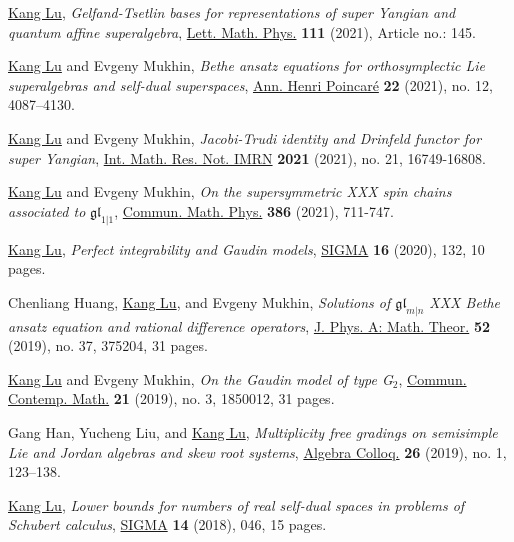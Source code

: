 \documentclass[11pt,letterpaper,roman,colorlinks,urlcolor=blue,linkcolor=blue
]{moderncv}
\begin{document}
\begin{etaremune}[leftmargin=1.17cm]
\item \underline{Kang Lu}, {\textit{Gelfand-Tsetlin bases for representations of super Yangian and quantum affine superalgebra}}, \href{https://link.springer.com/article/10.1007/s11005-021-01488-w}{Lett. Math. Phys.} \textbf{111} (2021), Article no.: 145.

\item \underline{Kang Lu} and Evgeny Mukhin, {\textit{Bethe ansatz equations for orthosymplectic Lie superalgebras and self-dual superspaces}}, \href{https://doi.org/10.1007/s00023-021-01091-8}{Ann. Henri Poincar\'{e}} \textbf{22} (2021), no. 12, 4087--4130.

\item \underline{Kang Lu} and Evgeny Mukhin, {\textit{Jacobi-Trudi identity and Drinfeld functor for super Yangian}}, \href{https://dx.doi.org/10.1093/imrn/rnab023}{Int. Math. Res. Not. IMRN} \textbf{2021} (2021), no. 21, 16749-16808.

\item \underline{Kang Lu} and Evgeny Mukhin, {\textit{On the supersymmetric XXX spin chains associated to} $\mathfrak{gl}_{1|1}$}, \href{https://dx.doi.org/10.1007/s00220-021-04155-2}{Commun. Math. Phys.} \textbf{386} (2021), 711-747.

\item \underline{Kang Lu}, \textit{Perfect integrability and Gaudin models}, \href{https://www.emis.de/journals/SIGMA/2020/132/}{SIGMA} \textbf{16} (2020), 132, 10 pages.
  
\item Chenliang Huang, \underline{Kang Lu}, and Evgeny Mukhin, {\textit{Solutions of $\mathfrak{gl}_{m|n}$ XXX Bethe ansatz equation and rational difference operators}}, \href{https://doi.org/10.1088/1751-8121/ab1960}{J. Phys. A: Math. Theor.} \textbf{52} (2019), no. 37, 375204, 31 pages.   
            
\item \underline{Kang Lu} and Evgeny Mukhin, {\textit{On the Gaudin model of type G$_2$}}, \href{https://doi.org/10.1142/S0219199718500128}{Commun. Contemp. Math.} \textbf{21} (2019), no. 3, 1850012, 31 pages.

\item Gang Han, Yucheng Liu, and \underline{Kang Lu}, {\textit{Multiplicity free gradings on semisimple Lie and Jordan algebras and skew root systems}}, \href{https://doi.org/10.1142/S1005386719000129}{Algebra Colloq.} {\textbf{26}} (2019), no. 1, 123--138.
            
\item \underline{Kang Lu}, {\textit{Lower bounds for numbers of real self-dual spaces in problems of Schubert calculus}}, \href{https://doi.org/10.3842/SIGMA.2018.046}{SIGMA} {\textbf{14}} (2018), 046, 15 pages. 
            

\end{etaremune}
\end{document}
